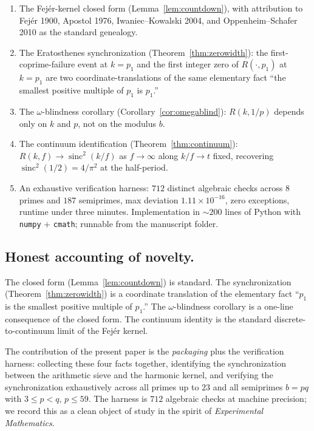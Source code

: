 \documentclass[11pt,reqno]{amsart}
\theoremstyle{plain}
\theoremstyle{definition}
\theoremstyle{remark}
\DeclareMathOperator{\sinc}{sinc}
\begin{document}
\begin{enumerate}[label={\upshape(\arabic*)}]
\item The Fej\'er-kernel closed form
(Lemma~\ref{lem:countdown}), with attribution to Fej\'er 1900,
Apostol 1976, Iwaniec--Kowalski 2004, and Oppenheim--Schafer
2010 as the standard genealogy.
\item The Eratosthenes synchronization
(Theorem~\ref{thm:zerowidth}): the first-coprime-failure event
at $k = p_1$ and the first integer zero of $R(\cdot, p_1)$ at
$k = p_1$ are two coordinate-translations of the same
elementary fact ``the smallest positive multiple of $p_1$ is
$p_1$.''
\item The $\omega$-blindness corollary
(Corollary~\ref{cor:omegablind}): $R(k, 1/p)$ depends only on
$k$ and $p$, not on the modulus $b$.
\item The continuum identification
(Theorem~\ref{thm:continuum}): $R(k, f) \to \sinc^2(k/f)$ as
$f \to \infty$ along $k/f \to t$ fixed, recovering
$\sinc^2(1/2) = 4/\pi^2$ at the half-period.
\item An exhaustive verification harness:
$712$ distinct algebraic checks across $8$ primes and $187$
semiprimes, max deviation $1.11 \times 10^{-16}$, zero
exceptions, runtime under three minutes. Implementation in
$\sim 200$ lines of Python with \texttt{numpy} +
\texttt{cmath}; runnable from the manuscript folder.
\end{enumerate}

\subsection*{Honest accounting of novelty.}

The closed form (Lemma~\ref{lem:countdown}) is standard. The
synchronization (Theorem~\ref{thm:zerowidth}) is a
coordinate translation of the elementary fact ``$p_1$ is the
smallest positive multiple of $p_1$.'' The $\omega$-blindness
corollary is a one-line consequence of the closed form. The
continuum identity is the standard discrete-to-continuum limit
of the Fej\'er kernel.

The contribution of the present paper is the \emph{packaging}
plus the verification harness: collecting these four facts
together, identifying the synchronization between the arithmetic
sieve and the harmonic kernel, and verifying the synchronization
exhaustively across all primes up to $23$ and all semiprimes
$b = pq$ with $3 \le p < q$, $p \le 59$. The harness is
$712$ algebraic checks at machine precision; we record this as
a clean object of study in the spirit of \emph{Experimental
Mathematics}.
\end{document}
